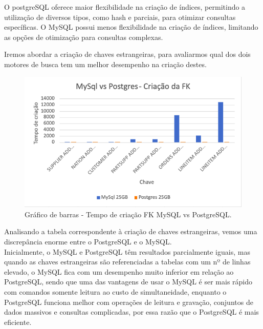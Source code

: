 \documentclass{article}
\begin{document}
\texttt{}\par O postgreSQL oferece maior flexibilidade na criação de índices, permitindo a utilização de diversos tipos, como hash e parciais, para otimizar consultas específicas. O MySQL possui menos flexibilidade na criação de índices, limitando as opções de otimização para consultas complexas.\\

\texttt{}\par Iremos abordar a criação de chaves estrangeiras, para avaliarmos qual dos dois motores de busca tem um melhor desempenho na criação destes.\\


\begin{figure}[H]
  \centering
  \includegraphics[width=\textwidth]{Graphs/FKCreation.png}
  \caption{Gráfico de barras - Tempo de criação FK MySQL vs PostgreSQL.}
  \label{fig:PKCreation2}
\end{figure}

Analisando a tabela correspondente à criação de chaves estrangeiras, vemos uma discrepância enorme entre o PostgreSQL e o MySQL.\\

Inicialmente, o MySQL e PostgreSQL têm resultados parcialmente iguais, mas quando as chaves estrangeiras são referenciadas a tabelas com um nº de linhas elevado, o MySQL fica com um desempenho muito inferior em relação ao PostgreSQL, sendo que uma das vantagens de usar o MySQL é  ser mais rápido com comandos somente leitura ao custo de simultaneidade, enquanto o PostgreSQL funciona melhor com operações de leitura e gravação, conjuntos de dados massivos e consultas complicadas, por essa razão que o PostgreSQL é mais eficiente.\\
\end{document}
